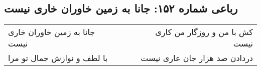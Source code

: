\begin{center}
\section*{رباعی شماره ۱۵۲: جانا به زمین خاوران خاری نیست}
\label{sec:sh152}
\begin{longtable}{l p{0.5cm} r}
جانا به زمین خاوران خاری نیست
&&
کش با من و روزگار من کاری نیست
\\
با لطف و نوازش جمال تو مرا
&&
دردادن صد هزار جان عاری نیست
\\
\end{longtable}
\end{center}
